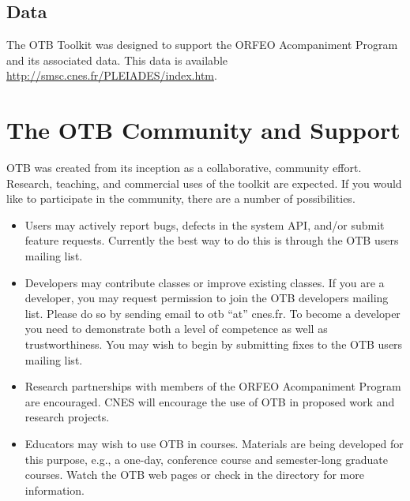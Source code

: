 \subsection{Data}
\label{sec:Data}

The OTB Toolkit was designed to support the ORFEO Acompaniment Program
and its associated data. This data is available
\url{http://smsc.cnes.fr/PLEIADES/index.htm}.


\section{The OTB Community and Support}
\label{sec:AdditionalResources}

OTB was created from its inception as a collaborative, community
effort. Research, teaching, and commercial uses of the toolkit are
expected. If you would like to participate in the community, there are a
number of possibilities.

\begin{itemize}
       \item Users may actively report bugs, defects in the system API,
       and/or submit feature requests. Currently the best way to do this is
       through the OTB users mailing list.

       \item Developers may contribute classes or improve existing
       classes. If you are a developer, you may request permission to join
       the OTB developers mailing list. Please do so by sending email to
       otb ``at'' cnes.fr. To become a developer you need to
       demonstrate both a level of competence as well as
       trustworthiness. You may wish to begin by submitting fixes to the OTB
       users mailing list.

       \item Research partnerships with members of the ORFEO
       Acompaniment Program are encouraged. CNES will encourage the use of
       OTB in proposed work and research projects.


       \item Educators may wish to use OTB in courses. Materials are being
       developed for this purpose, e.g., a one-day, conference course and
       semester-long graduate courses. Watch the OTB web pages or check in
       the  directory for more information.
\end{itemize}

